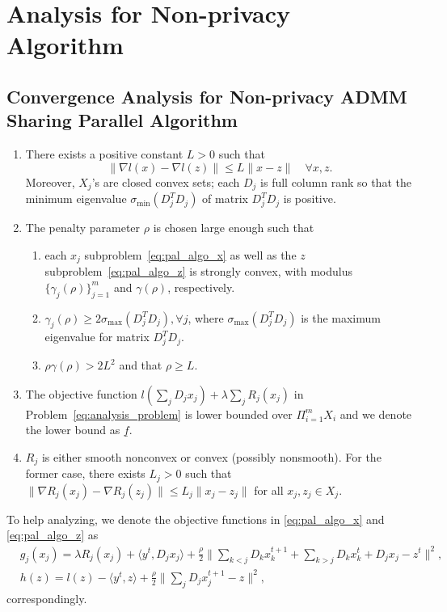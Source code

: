 \section{Analysis for Non-privacy Algorithm}
\subsection{Convergence Analysis for Non-privacy ADMM Sharing Parallel Algorithm}
\begin{assume}\label{theo:assumptions_pal}
\begin{enumerate}
    \item There exists a positive constant $L>0$ such that 
        \[
            \|\nabla l(x)-\nabla l(z)\| \le L\|x-z\|\quad \forall x, z.
        \]
        Moreover, $X_j$'s are closed convex sets; each $D_j$ is full column rank so that the minimum eigenvalue $\sigma_{\text{min}}(D^T_jD_j)$ of matrix $D^T_jD_j$ is positive.\label{item:assum_1_pal}
    \item The penalty parameter $\rho$ is chosen large enough such that
    \begin{enumerate}
        \item each $x_j$ subproblem~\eqref{eq:pal_algo_x} as well as the $z$ subproblem~\eqref{eq:pal_algo_z} is strongly convex, with modulus $\{\gamma_j(\rho)\}_{j=1}^m$ and $\gamma(\rho)$, respectively. \label{item:asusum_2_1_pal}
        \item $\gamma_j(\rho)\ge 2\sigma_{\text{max}}(D^T_jD_j), \forall j$, where $\sigma_{\text{max}}(D^T_jD_j)$ is the maximum eigenvalue for matrix $D^T_jD_j$. 
        \item $\rho\gamma(\rho)>2L^2$ and that $\rho\ge L$.
    \end{enumerate}
    \label{item:assum_2_pal}
    \item The objective function $l\left(\sum_j D_jx_j\right) + \lambda\sum_j R_j(x_j)$ in Problem~\ref{eq:analysis_problem} is lower bounded over $\Pi_{i=1}^mX_i$ and we denote the lower bound as $\underline{f}$.\label{item:assum_3_pal}
    \item $R_j$ is either smooth nonconvex or convex (possibly nonsmooth). For the former case, there exists $L_j>0$ such that $\|\nabla R_j(x_j) - \nabla R_j(z_j)\|\le L_j\|x_j-z_j\|$ for all $x_j, z_j\in X_j$.\label{item:assum_4_pal}
\end{enumerate}
\end{assume}
To help analyzing, we denote the objective functions in \eqref{eq:pal_algo_x} and \eqref{eq:pal_algo_z} as 
\begin{align}
    & g_j(x_j) = \lambda R_j(x_j) + \langle y^t, D_jx_j\rangle + \frac{\rho}{2}\big\|\sum_{k<j}D_kx_k^{t+1} + \sum_{k>j}D_kx_k^t + D_jx_j - z^t\big\|^2,\nonumber\\
    & h(z) = l(z)  - \langle y^t, z \rangle + \frac{\rho}{2} \big\|\sum_jD_jx_j^{t+1} - z\big\|^2,
\end{align}
correspondingly. 

